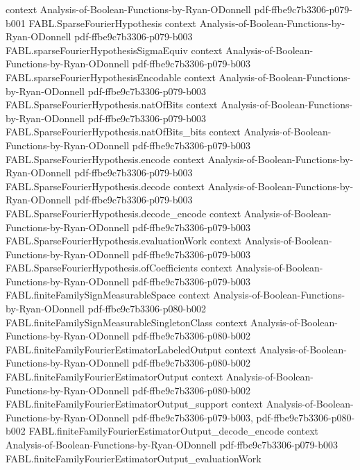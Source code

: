 \begin{theorem}
  {context}
  {Analysis-of-Boolean-Functions-by-Ryan-ODonnell}
  {pdf-ffbe9c7b3306-p079-b001}
\proofstep
  {FABL.SparseFourierHypothesis}
  {context}
  {Analysis-of-Boolean-Functions-by-Ryan-ODonnell}
  {pdf-ffbe9c7b3306-p079-b003}
\proofstep
  {FABL.sparseFourierHypothesisSigmaEquiv}
  {context}
  {Analysis-of-Boolean-Functions-by-Ryan-ODonnell}
  {pdf-ffbe9c7b3306-p079-b003}
\proofstep
  {FABL.sparseFourierHypothesisEncodable}
  {context}
  {Analysis-of-Boolean-Functions-by-Ryan-ODonnell}
  {pdf-ffbe9c7b3306-p079-b003}
\proofstep
  {FABL.SparseFourierHypothesis.natOfBits}
  {context}
  {Analysis-of-Boolean-Functions-by-Ryan-ODonnell}
  {pdf-ffbe9c7b3306-p079-b003}
\proofstep
  {FABL.SparseFourierHypothesis.natOfBits_bits}
  {context}
  {Analysis-of-Boolean-Functions-by-Ryan-ODonnell}
  {pdf-ffbe9c7b3306-p079-b003}
\proofstep
  {FABL.SparseFourierHypothesis.encode}
  {context}
  {Analysis-of-Boolean-Functions-by-Ryan-ODonnell}
  {pdf-ffbe9c7b3306-p079-b003}
\proofstep
  {FABL.SparseFourierHypothesis.decode}
  {context}
  {Analysis-of-Boolean-Functions-by-Ryan-ODonnell}
  {pdf-ffbe9c7b3306-p079-b003}
\proofstep
  {FABL.SparseFourierHypothesis.decode_encode}
  {context}
  {Analysis-of-Boolean-Functions-by-Ryan-ODonnell}
  {pdf-ffbe9c7b3306-p079-b003}
\proofstep
  {FABL.SparseFourierHypothesis.evaluationWork}
  {context}
  {Analysis-of-Boolean-Functions-by-Ryan-ODonnell}
  {pdf-ffbe9c7b3306-p079-b003}
\proofstep
  {FABL.SparseFourierHypothesis.ofCoefficients}
  {context}
  {Analysis-of-Boolean-Functions-by-Ryan-ODonnell}
  {pdf-ffbe9c7b3306-p079-b003}
\proofstep
  {FABL.finiteFamilySignMeasurableSpace}
  {context}
  {Analysis-of-Boolean-Functions-by-Ryan-ODonnell}
  {pdf-ffbe9c7b3306-p080-b002}
\proofstep
  {FABL.finiteFamilySignMeasurableSingletonClass}
  {context}
  {Analysis-of-Boolean-Functions-by-Ryan-ODonnell}
  {pdf-ffbe9c7b3306-p080-b002}
\proofstep
  {FABL.finiteFamilyFourierEstimatorLabeledOutput}
  {context}
  {Analysis-of-Boolean-Functions-by-Ryan-ODonnell}
  {pdf-ffbe9c7b3306-p080-b002}
\proofstep
  {FABL.finiteFamilyFourierEstimatorOutput}
  {context}
  {Analysis-of-Boolean-Functions-by-Ryan-ODonnell}
  {pdf-ffbe9c7b3306-p080-b002}
\proofstep
  {FABL.finiteFamilyFourierEstimatorOutput_support}
  {context}
  {Analysis-of-Boolean-Functions-by-Ryan-ODonnell}
  {pdf-ffbe9c7b3306-p079-b003,
    pdf-ffbe9c7b3306-p080-b002}
\proofstep
  {FABL.finiteFamilyFourierEstimatorOutput_decode_encode}
  {context}
  {Analysis-of-Boolean-Functions-by-Ryan-ODonnell}
  {pdf-ffbe9c7b3306-p079-b003}
\proofstep
  {FABL.finiteFamilyFourierEstimatorOutput_evaluationWork}

\end{theorem}
